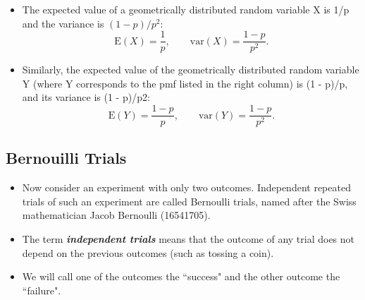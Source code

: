 \documentclass[]{report}
\begin{document}
\begin{itemize}
	\item
	
	The expected value of a geometrically distributed random variable X is 1/p and the variance is $(1 - p)/p^2$:
	\[ \mathrm{E}(X) = \frac{1}{p}, \qquad\mathrm{var}(X) = \frac{1-p}{p^2}. \]
	\item Similarly, the expected value of the geometrically distributed random variable Y (where Y corresponds to the pmf listed in the right column) is (1 - p)/p, 
	and its variance is (1 - p)/p2:
	\[ \mathrm{E}(Y) = \frac{1-p}{p}, \qquad\mathrm{var}(Y) = \frac{1-p}{p^2}.\]
	
\end{itemize}

\subsection{Bernouilli Trials}
\begin{itemize}
	\item Now consider an experiment with only two outcomes. Independent repeated trials of such an experiment are
	called Bernoulli trials, named after the Swiss mathematician Jacob Bernoulli (16541705). \item The term \textbf{\emph{independent
			trials}} means that the outcome of any trial does not depend on the previous outcomes (such as tossing a coin).
	\item We will call one of the outcomes the ``success" and the other outcome the ``failure".
\end{itemize}
\end{document}
